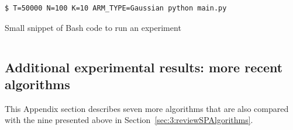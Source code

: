 \begin{listing}[h!]
    \begin{verbatim}
$ T=50000 N=100 K=10 ARM_TYPE=Gaussian python main.py
    \end{verbatim}
    \caption{Small snippet of Bash code to run an experiment}
    \label{lst:3:howToRunExperiment2}
\end{listing}

\begin{small}
    \inputminted[linenos=true,numbersep=5pt,frame=lines,framesep=2mm]{python3}{2-Chapters/3-Chapter/src/example_of_configuration_singleplayer.py}
\end{small}


\subsection{Additional experimental results: more recent algorithms}
\label{sub:3:additionalExperiments}

This Appendix section describes seven more algorithms that are also compared with the nine presented above in Section~\ref{sec:3:reviewSPAlgorithms}.



